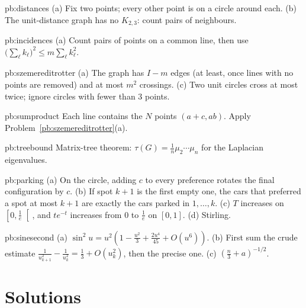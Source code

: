 \begin{hint}{pb:distances}
(a) Fix two points; every other point is on a circle around each. (b) The unit-distance graph has no $K_{2,3}$: count pairs of
neighbours.
\end{hint}

\begin{hint}{pb:incidences}
(a) Count pairs of points on a common line, then use $\bigl(\sum_\ell k_\ell\bigr)^2\le m\sum_\ell k_\ell^2$.
\end{hint}

\begin{hint}{pb:szemereditrotter}
(a) The graph has $I-m$ edges (at least, once lines with no points are removed) and at most $m^2$ crossings. (c) Two unit circles cross
at most twice; ignore circles with fewer than $3$ points.
\end{hint}

\begin{hint}{pb:sumproduct}
Each line contains the $N$ points $(a+c,ab)$. Apply Problem~\ref{pb:szemereditrotter}(a).
\end{hint}

\begin{hint}{pb:treebound}
Matrix-tree theorem: $\tau(G)=\frac1n\mu_2\cdots\mu_n$ for the Laplacian eigenvalues.
\end{hint}

\begin{hint}{pb:parking}
(a) On the circle, adding $c$ to every preference rotates the final configuration by $c$. (b) If spot $k+1$ is the first empty one, the cars that preferred a spot at most $k+1$
are exactly the cars parked in $1,\dots,k$. (c) $T$ increases on $\left[0,\frac1e\right[$, and $te^{-t}$ increases from $0$ to $\frac1e$ on $[0,1]$. (d) Stirling.
\end{hint}

\begin{hint}{pb:sinesecond}
(a) $\sin^2u=u^2(1-\frac{u^2}3+\frac{2u^4}{45}+O(u^6))$. (b) First sum the crude estimate $\frac1{u_{k+1}^2}-\frac1{u_k^2}=\frac13+O(u_k^2)$, then the precise one. (c) $(\frac n3+a)^{-1/2}$.
\end{hint}

\section{Solutions}

